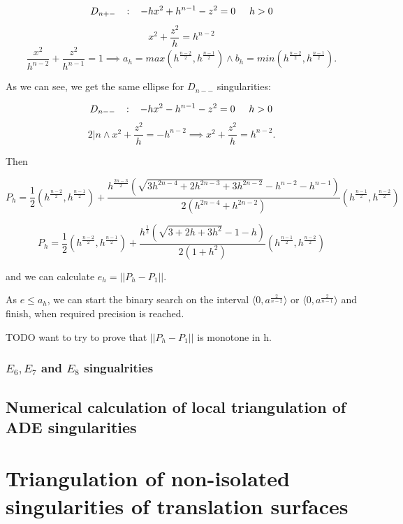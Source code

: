 $$D_{n+-} \hspace{3mm} :\hspace{3mm}  -hx^2+h^{n-1}-z^2 = 0 \hspace{5mm} h>0$$
$$x^2 + \frac{z^2}{h} = h^{n-2}$$
$$\frac{x^2}{h^{n-2}} + \frac{z^2}{h^{n-1}} = 1 \implies a_h=max(h^\frac{n-2}{2}, h^\frac{n-1}{2}) \land b_h=min(h^\frac{n-2}{2}, h^\frac{n-1}{2}).$$

As we can see, we get the same ellipse for $D_{n--}$ singularities:

$$D_{n--} \hspace{3mm} :\hspace{3mm}  -hx^2-h^{n-1}-z^2 = 0 \hspace{5mm} h>0$$
$$2|n \land x^2 + \frac{z^2}{h} = -h^{n-2} \implies x^2 + \frac{z^2}{h} = h^{n-2}.$$


Then 

$$P_h=\frac{1}{2}(h^\frac{n-2}{2},h^\frac{n-1}{2}) + \frac{h^\frac{2n-3}{2}(\sqrt{3h^{2n-4}+2h^{2n-3}+3h^{2n-2}}-h^{n-2}-h^{n-1})}{2(h^{2n-4}+h^{2n-2})}(h^\frac{n-1}{2},h^\frac{n-2}{2})$$

$$P_h=\frac{1}{2}(h^\frac{n-2}{2},h^\frac{n-1}{2}) + \frac{h^\frac{1}{2}(\sqrt{3+2h+3h^2}-1-h)}{2(1+h^2)}(h^\frac{n-1}{2},h^\frac{n-2}{2})$$

and we can calculate $e_h=||P_h-P_1||$.

As $e \leq a_h$, we can start the binary search on the interval
$\langle 0, a^\frac{2}{n-2}\rangle$ or $\langle 0, a^\frac{2}{n-1}\rangle$
and finish, when required precision is reached.

TODO want to try to prove that $||P_h-P_1||$ is monotone in h.

\subsubsection*{$E_6, E_7$ and $E_8$ singualrities}

\subsection*{Numerical calculation of local triangulation of ADE singularities}


\section{Triangulation of non-isolated singularities of translation surfaces}
\label{sub3.3}
